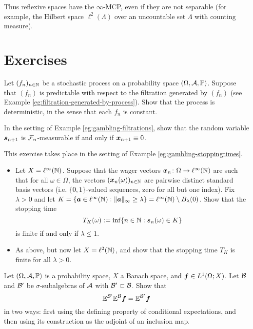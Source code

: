 Thus reflexive spaces have the $\infty$-MCP, even if they are not separable (for example, the Hilbert space $\ell^2(\Lambda)$ over an uncountable set $\Lambda$ with counting measure).


\section*{Exercises}

\begin{exercise}
  Let $(f_n)_{n \in \mathbb{N}}$ be a stochastic process on a probability space $(\Omega,\mathcal{A},\mathbb{P})$.
  Suppose that $(f_n)$ is predictable with respect to the filtration generated by $(f_n)$ (see Example \ref{eg:filtration-generated-by-process}).
  Show that the process is deterministic, in the sense that each $f_n$ is constant.
\end{exercise}

\begin{exercise}\label{ex:winnings-unpredictability}
  In the setting of Example \ref{eg:gambling-filtrations}, show that the random variable $\bm{s}_{n+1}$ is $\mathcal{F}_n$-measurable if and only if $\bm{x}_{n+1} \equiv 0$.
\end{exercise}

\begin{exercise}\label{ex:gambling-in-linfty}
  This exercise takes place in the setting of Example \ref{eg:gambling-stoppingtimes}.
  \begin{itemize}
  \item
    Let $X = \ell^\infty(\mathbb{N})$.
    Suppose that the wager vectors $\bm{x}_n \colon \Omega \rightarrow \ell^\infty(\mathbb{N})$ are such that for all $\omega \in \Omega$, the vectors $(\bm{x}_n(\omega))_{n \in \mathbb{N}}$ are pairwise distinct standard basis vectors (i.e. $\{0,1\}$-valued sequences, zero for all but one index).
    Fix $\lambda > 0$ and let $K = \{\bm{a} \in \ell^\infty(\mathbb{N}) : \|\bm{a}\|_\infty \geq \lambda\} = \ell^\infty(\mathbb{N}) \setminus B_\lambda(0)$.
    Show that the stopping time
    \begin{equation*}
      T_K(\omega) := \inf\{n \in \mathbb{N} : \bm{s}_n(\omega) \in K\} 
    \end{equation*}
    is finite if and only if $\lambda \leq 1$.
  \item
    As above, but now let $X = \ell^2(\mathbb{N})$, and show that the stopping time $T_K$ is finite for all $\lambda > 0$.
  \end{itemize}
\end{exercise}

\begin{exercise}\label{ex:CE-monotonicity}
  Let $(\Omega,\mathcal{A},\mathbb{P})$ is a probability space, $X$ a Banach space, and $\bm{f} \in L^1(\Omega;X)$.
  Let $\mathcal{B}$ and $\mathcal{B}'$ be $\sigma$-subalgebras of $\mathcal{A}$ with $\mathcal{B}' \subset \mathcal{B}$.
  Show that
  \begin{equation*}
    \mathbb{E}^{\mathcal{B}'} \mathbb{E}^{\mathcal{B}} \bm{f} = \mathbb{E}^{\mathcal{B}'} \bm{f}
  \end{equation*}
  in two ways: first using the defining property of conditional expectations, and then using its construction as the adjoint of an inclusion map.
\end{exercise}


